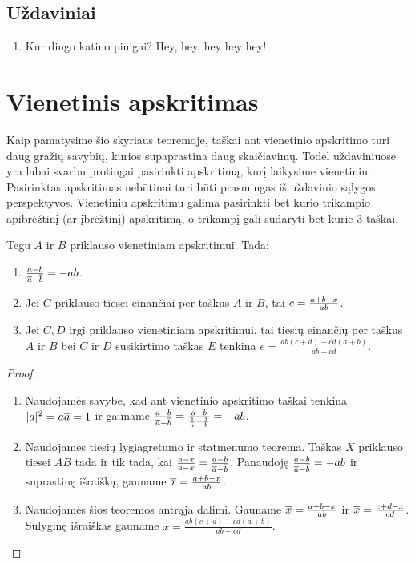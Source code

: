 \documentclass[11pt,a4paper,twoside]{book}
\begin{document}
\subsection{Uždaviniai}

\begin{enumerate}
  \item Kur dingo katino pinigai? Hey, hey, hey hey hey!
\end{enumerate}

\section{Vienetinis apskritimas}

Kaip pamatysime šio skyriaus teoremoje, taškai ant vienetinio apskritimo turi daug gražių savybių, kurios supaprastina daug skaičiavimų. Todėl uždaviniuose yra labai svarbu protingai pasirinkti apskritimą, kurį laikysime vienetiniu. Pasirinktas apskritimas nebūtinai turi būti prasmingas iš uždavinio sąlygos perspektyvos. Vienetiniu apskritimu galima pasirinkti bet kurio trikampio apibrėžtinį (ar įbrėžtinį) apskritimą, o trikampį gali sudaryti bet kurie 3 taškai.

\begin{thmnr} Tegu $A$ ir $B$
  priklauso vienetiniam apskritimui. Tada:

  \begin{enumerate}
    \item $\frac{a - b}{\overline{a} -\overline{b}}=-ab$.
    \item Jei $C$ priklauso tiesei einančiai per taškus $A$ ir $B$, tai
      $\overline{c}=\frac{a + b - x}{ab}$.
    \item Jei $C, D$ irgi priklauso vienetiniam apskritimui, tai tiesių einančių
      per taškus $A$ ir $B$ bei $C$ ir $D$ susikirtimo taškas $E$ tenkina
      $e=\frac{ab(c+d) - cd(a+b)}{ab - cd}$.
  \end{enumerate}
\end{thmnr}

\begin{proof}
\begin{enumerate} 
\item Naudojamės savybe, kad ant vienetinio apskritimo taškai tenkina $|a|^2=a\overline{a}=1$ ir gauname $\frac{a - b}{\overline{a} -\overline{b}}=\frac{a - b}{\frac{1}{a} -\frac{1}{b}}=-ab$.
\item Naudojamės tiesių lygiagretumo ir statmenumo teorema. Taškas $X$ priklauso tiesei $AB$ tada ir tik tada, kai $\frac{a-x}{\overline{a}-\overline{x}}=\frac{a-b}{\overline{a}-\overline{b}}$. Panaudoję $\frac{a - b}{\overline{a} -\overline{b}}=-ab$ ir suprastinę išraišką, gauname $\overline{x}=\frac{a + b - x}{ab}$.
\item Naudojamės šios teoremos antrąja dalimi. Gauname $\overline{x}=\frac{a + b - x}{ab}$ ir $\overline{x}=\frac{c+ d - x}{cd}$. Sulyginę išraiškas gauname $x=\frac{ab(c+d) - cd(a+b)}{ab - cd}$.
\end{enumerate}
\end{proof}
\end{document}
